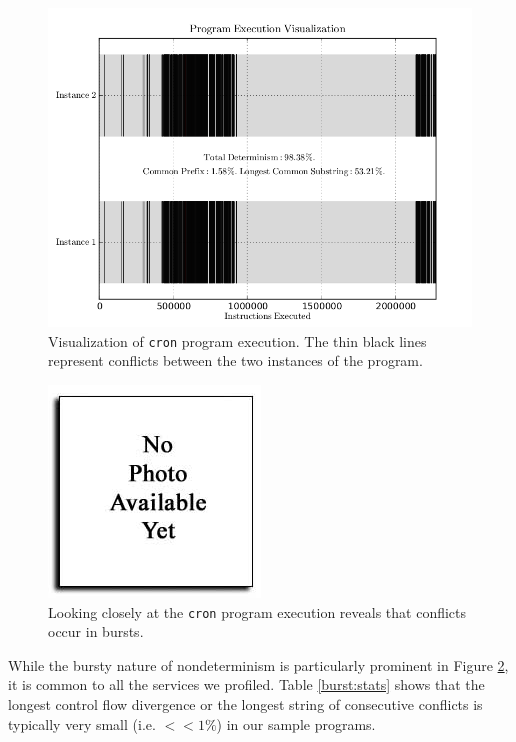 \begin{figure}[h]
  \center
  \includegraphics[trim=0cm 0cm 0cm 0cm, scale=0.5]{crontracech2.png}
  \caption[Visualization of \texttt{cron} program execution]%
          {Visualization of \texttt{cron} program execution.
          The thin black lines represent conflicts between
          the two instances of the program.}
  \label{cron:tracech2}
\end{figure} 


\begin{figure}[h]
  \center
  \includegraphics[trim=0cm 0cm 0cm 0cm, scale=0.75]{none.jpg}
  \caption[Understanding nature of conflicts in \texttt{cron}]%
  {Looking closely at the \texttt{cron} program execution reveals
    that conflicts occur in bursts.}
  \label{cron:zoomtracech2}
\end{figure} 

While the bursty nature of nondeterminism
is particularly prominent in Figure \ref{cron:zoomtracech2},
it is common to all the services we profiled. Table \ref{burst:stats}
shows that the longest control flow divergence 
or the longest string of consecutive conflicts
is typically very small (i.e. $<<1\%$) 
in our sample programs.

